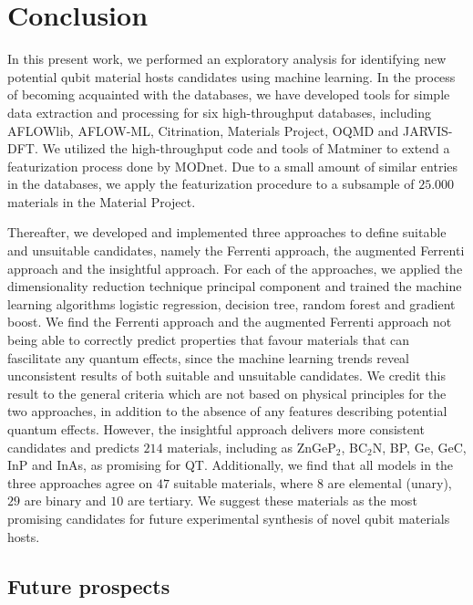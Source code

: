 \chapter*{Conclusion}

In this present work, we performed an exploratory analysis for identifying new potential qubit material hosts candidates using machine learning. In the process of becoming acquainted with the databases, we have developed tools for simple data extraction and processing for six high-throughput databases, including AFLOWlib, AFLOW-ML, Citrination, Materials Project, OQMD and JARVIS-DFT. We utilized the high-throughput code and tools of Matminer to extend a featurization process done by MODnet. Due to a small amount of similar entries in the databases, we apply the featurization procedure to a subsample of $25.000$ materials in the Material Project.

Thereafter, we developed and implemented three approaches to define suitable and unsuitable candidates, namely the Ferrenti approach, the augmented Ferrenti approach and the insightful approach. For each of the approaches, we applied the dimensionality reduction technique principal component and trained the machine learning algorithms logistic regression, decision tree, random forest and gradient boost. We find the Ferrenti approach and the augmented Ferrenti approach not being able to correctly predict properties that favour materials that can fascilitate any quantum effects, since the machine learning trends reveal unconsistent results of both suitable and unsuitable candidates. We credit this result to the general criteria which are not based on physical principles for the two approaches, in addition to the absence of any features describing potential quantum effects. However, the insightful approach delivers more consistent candidates and predicts $214$ materials, including as ZnGeP$_2$, BC$_2$N, BP, Ge, GeC, InP and InAs, as promising for QT. Additionally, we find that all models in the three approaches agree on $47$ suitable materials, where $8$ are elemental (unary), $29$ are binary and $10$ are tertiary. We suggest these materials as the most promising candidates for future experimental synthesis of novel qubit materials hosts. %
\clearpage
\section*{Future prospects}

